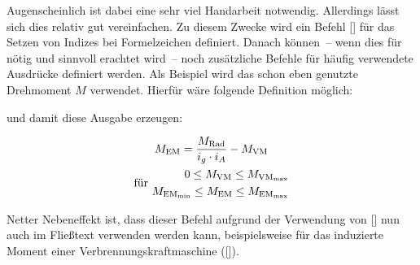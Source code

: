 \documentclass[english,ngerman]{tudscrartcl}
\begin{document}
%
Augenscheinlich ist dabei eine sehr viel Handarbeit notwendig. Allerdings 
lässt sich dies relativ gut vereinfachen. Zu diesem Zwecke wird ein Befehl 
[\PParameter{\dots}] für das Setzen von Indizes bei Formelzeichen 
definiert. Danach können~-- wenn dies für nötig und sinnvoll erachtet wird~-- 
noch zusätzliche Befehle für häufig verwendete Ausdrücke definiert werden. Als 
Beispiel wird das schon eben genutzte Drehmoment \ensuremath{M} verwendet. 
Hierfür wäre folgende Definition möglich:
%
\CodeHook{\let\newcommand\renewcommand}
\begin{Trunk*}
\newcommand*{\ind}[1]{\ensuremath{_\mathrm{#1}}}
\newcommand*{\M}[1]{\ensuremath{M\ind{#1}}}

\end{Trunk*}
%
und damit diese Ausgabe erzeugen:
%
\begin{Trunk*}
\begin{equation*}
\begin{gathered}
\M{EM} = \frac{\M{Rad}}{i_g \cdot i_A} - \M{VM} \\
\textrm{für }
\begin{aligned}
0\leq \M{VM}\leq \M{VM_{max}} \\ 
\M{EM_{min}}\leq \M{EM}\leq \M{EM_{max}}
\end{aligned}
\end{gathered}
\end{equation*}

\end{Trunk*}
%
Netter Nebeneffekt ist, dass dieser Befehl aufgrund der Verwendung von 
[\PParameter{\dots}] nun auch im Fließtext verwenden werden 
kann, beispielsweise für das induzierte Moment einer Verbrennungskraftmaschine 
 ([]).
\end{document}

